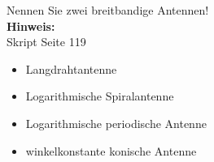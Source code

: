 \begin{question}[section=11,name={Breitbandantennen},difficulty=,quantity=1,type=thr,tags={20130625,20060816}]
	Nennen Sie zwei breitbandige Antennen!
	\\ \textbf{Hinweis:}\\
	Skript Seite 119
\end{question}
\begin{solution}
	\begin{itemize}
		\item{Langdrahtantenne}
		\item{Logarithmische Spiralantenne}
		\item{Logarithmische periodische Antenne}
		\item{winkelkonstante konische Antenne}
	\end{itemize}
\end{solution}
